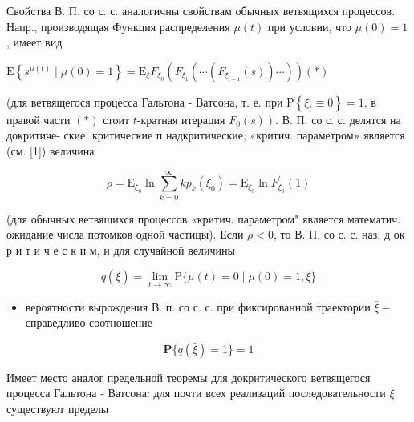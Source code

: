 \documentclass[10pt]{article}
\begin{document}
Свойства В. П. со с. с. аналогичны свойствам обычных ветвящихся процессов. Напр., производящая Функция распределения $\mu(t)$ при условии, что $\mu(0)=1$, имеет вид



$\mathrm{E}\left\{s^{\mu(t)} \mid \mu(0)=1\right\}=\mathrm{E}_{\xi} F_{\xi_{0}}\left(F_{\xi_{1}}\left(\cdots\left(F_{\xi_{t-1}}(s)\right) \cdots\right)\right)(*)$



(для ветвящегося процесса Гальтона - Ватсона, т. е. при $\mathrm{P}\left\{\xi_{t} \equiv 0\right\}=1$, в правой части $(*)$ стоит $t$-кратная итерация $\left.F_{0}(s)\right)$. В. П. со с. с. делятся на докритиче- ские, критические п надкритические; «критич. параметром» является (см. [1]) величина



\[

\rho=\mathrm{E}_{\xi_{0}} \ln \sum_{k=0}^{\infty} k p_{k}\left(\xi_{0}\right)=\mathrm{E}_{\xi_{0}} \ln F_{\xi_{0}}^{\prime}(1)

\]



(для обычных ветвящихся процессов «критич. параметром" является математич. ожидание числа потомков одной частицы). Если $\rho<0$, то В. П. со с. с. наз. д ок р и т и ч е с к и м, и для случайной величины



\[

q(\bar{\xi})=\lim _{t \rightarrow \infty} \mathrm{P}\{\mu(t)=0 \mid \mu(0)=1, \bar{\xi}\}

\]



\begin{itemize}

  \item вероятности вырождения В. п. со с. с. при фиксированной траектории $\bar{\xi}-$ справедливо соотношение

\end{itemize}



\[

\mathbf{P}\{q(\bar{\xi})=1\}=1

\]



Имеет место аналог предельной теоремы для докритического ветвящегося процесса Гальтона - Ватсона: для почти всех реализаций последовательности $\bar{\xi}$ существуют пределы
\end{document}
